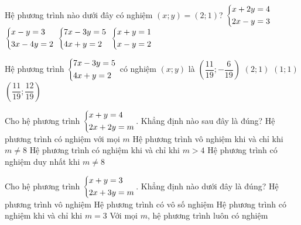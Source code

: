 \begin{bt}
	Hệ phương trình nào dưới đây có nghiệm $(x;y)=(2;1)$?
	\choice
	{\True $\left\{\begin{aligned}&x+2y=4\\&2x-y=3\end{aligned}\right.$}
	{$\left\{\begin{aligned}&x-y=3\\&3x-4y=2\end{aligned}\right.$}
	{$\left\{\begin{aligned}&7x-3y=5\\&4x+y=2\end{aligned}\right.$}
	{$\left\{\begin{aligned}&x+y=1\\&x-y=2\end{aligned}\right.$}
\end{bt}

\begin{bt}
	Hệ phương trình $\left\{\begin{aligned}&7x-3y=5\\&4x+y=2\end{aligned}\right.$ có nghiệm $(x;y)$ là
	\choice
	{\True $\left(\dfrac{11}{19};-\dfrac{6}{19}\right)$}
	{$(2;1)$}
	{$(1;1)$}
	{$\left(\dfrac{11}{19};\dfrac{12}{19}\right)$}
\end{bt}

\begin{bt}
	Cho hệ phương trình $\left\{\begin{aligned}&x+y=4\\&2x+2y=m\end{aligned}\right.$. Khẳng định nào sau đây là đúng?
	\choice
	{Hệ phương trình có nghiệm với mọi $m$}
	{\True Hệ phương trình vô nghiệm khi và chỉ khi $m\ne 8$}
	{Hệ phương trình có nghiệm khi và chỉ khi $m>4$}
	{Hệ phương trình có nghiệm duy nhất khi $m\ne 8$}
\end{bt}

\begin{bt}
	Cho hệ phương trình $\left\{\begin{aligned}&x+y=3\\&2x+3y=m\end{aligned}\right.$. Khẳng định nào dưới đây là đúng?
	\choice
	{Hệ phương trình vô nghiệm}
	{Hệ phương trình có vô số nghiệm}
	{Hệ phương trình có nghiệm khi và chỉ khi $m=3$}
	{\True Với mọi $m$, hệ phương trình luôn có nghiệm}
\end{bt}

